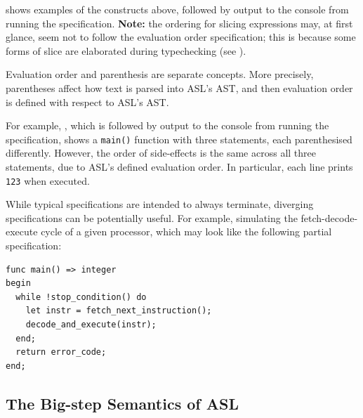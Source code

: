  shows examples of the constructs above, followed by output to the console from running the specification.
\textbf{Note:} the ordering for slicing expressions may, at first glance, seem not to follow the evaluation order specification; this is because some forms of slice are elaborated during typechecking (see ).


Evaluation order and parenthesis are separate concepts. More precisely,
parentheses affect how text is parsed into ASL's AST, and then evaluation
order is defined with respect to ASL's AST.

For example, ,
which is followed by output to the console from running the specification,
shows a \verb|main()|
function with three statements, each parenthesised differently.
However, the order of side-effects is the same
across all three statements, due to ASL's defined evaluation order.
In particular, each line prints \verb|123| when executed.


While typical specifications are intended to always terminate,
diverging specifications can be potentially useful.
For example, simulating the fetch-decode-execute cycle of a given processor,
which may look like the following partial specification:
\begin{lstlisting}
func main() => integer
begin
  while !stop_condition() do
    let instr = fetch_next_instruction();
    decode_and_execute(instr);
  end;
  return error_code;
end;
\end{lstlisting}

\subsection{The Big-step Semantics of ASL}

